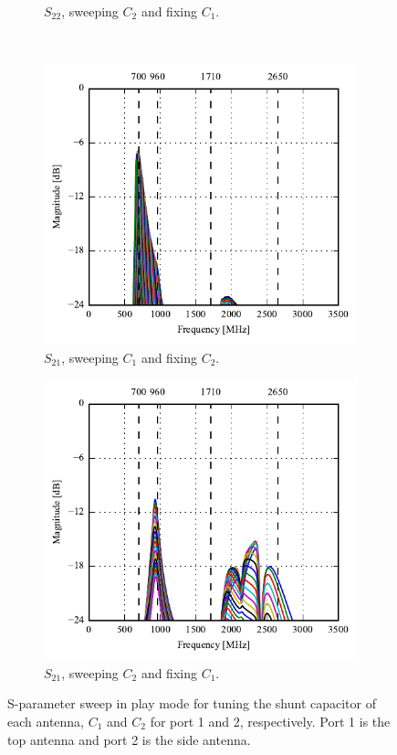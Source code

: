 \begin{figure}[htbp]
\begin{subfigure}[b]{0.49\linewidth}
        \caption{$S_{22}$, sweeping $C_2$ and fixing $C_1$.}
    \end{subfigure}
~
    \begin{subfigure}[b]{0.49\linewidth}
        \centering
        \includegraphics{img/tech_sol/monopole/highband/ue/playmode/s12.pdf}
        \caption{$S_{21}$, sweeping $C_1$ and fixing $C_2$.}
    \end{subfigure}
    \hfill
    \begin{subfigure}[b]{0.49\linewidth}
        \centering
        \includegraphics{img/tech_sol/monopole/highband/ue/playmode/s21.pdf}
        \caption{$S_{21}$, sweeping $C_2$ and fixing $C_1$.}
    \end{subfigure}
    \caption{S-parameter sweep in play mode for tuning the shunt capacitor of each antenna, $C_1$ and $C_2$ for port 1 and 2, respectively. Port 1 is the top antenna and port 2 is the side antenna.}
    \label{fig:sparam_mono_modi_play_mode}
\end{figure}

